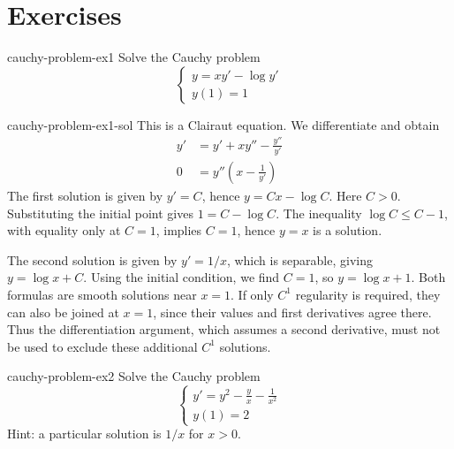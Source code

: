 \documentclass[preview]{standalone}
\begin{document}
\genpage

\section{Exercises}

\begin{snippetexercise}{cauchy-problem-ex1}{}
    Solve the Cauchy problem
    \[
        \begin{cases}
            y = xy' - \log y' \\
            y(1) = 1
        \end{cases}
    \]
\end{snippetexercise}

\begin{snippetsolution}{cauchy-problem-ex1-sol}{}
    This is a Clairaut equation. We differentiate and obtain
    \begin{align*}
        y' &= y' + xy'' - \frac{y''}{y'} \\
        0 &= y''\left(x - \frac{1}{y'}\right)
    \end{align*}
    The first solution is given by \(y' = C\), hence \(y = Cx - \log C\).
    Here \(C>0\). Substituting the initial point gives \(1=C-\log C\).
    The inequality \(\log C\leq C-1\), with equality only at \(C=1\),
    implies \(C=1\), hence \(y=x\) is a solution.

    The second solution is given by \(y' = 1/x\), which is separable, giving \(y = \log x + C\).
    Using the initial condition, we find \(C = 1\), so \(y = \log x + 1\).
    Both formulas are smooth solutions near \(x=1\). If only \(C^1\)
    regularity is required, they can also be joined at \(x=1\), since their
    values and first derivatives agree there. Thus the differentiation
    argument, which assumes a second derivative, must not be used to exclude
    these additional \(C^1\) solutions.
\end{snippetsolution}

\begin{snippetexercise}{cauchy-problem-ex2}{}
    Solve the Cauchy problem
    \[
        \begin{cases}
            y' = y^2 - \frac{y}{x} - \frac{1}{x^2}     \\
            y(1) = 2
        \end{cases}
    \]
    Hint: a particular solution is \(1/x\) for \(x > 0\).
\end{snippetexercise}
\end{document}
